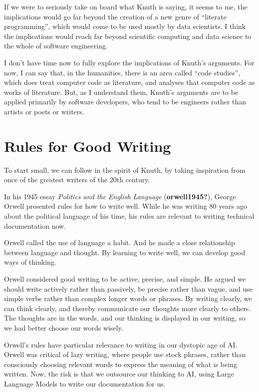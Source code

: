 \documentclass[
  letterpaper,
  DIV=11,
  numbers=noendperiod]{scrartcl}
\begin{document}
If we were to seriously take on board what Knuth is saying, it seems to
me, the implications would go far beyond the creation of a new genre of
``literate programming'', which would come to be used mostly by data
scientists. I think the implications would reach far beyond scientific
computing and data science to the whole of software engineering.

I don't have time now to fully explore the implications of Knuth's
arguments. For now, I can say that, in the humanities, there is an area
called ``code studies'', which does treat computer code as literature,
and analyses that computer code as works of literature. But, as I
understand them, Knuth's arguments are to be applied primarily by
software developers, who tend to be engineers rather than artists or
poets or writers.

\section{Rules for Good Writing}\label{rules-for-good-writing}

To start small, we can follow in the spirit of Knuth, by taking
inspiration from once of the greatest writers of the 20th century.

In his 1945 essay \emph{Politics and the English Language}
(\textbf{orwell1945?}), George Orwell presented rules for how to write
well. While he was writing 80 years ago about the political language of
his time, his rules are relevant to writing technical documentation now.

Orwell called the use of language a habit. And he made a close
relationship between language and thought. By learning to write well, we
can develop good ways of thinking.

Orwell considered good writing to be active, precise, and simple. He
argued we should write actively rather than passively, be precise rather
than vague, and use simple verbs rather than complex longer words or
phrases. By writing clearly, we can think clearly, and thereby
communicate our thoughts more clearly to others. The thoughts are in the
words, and our thinking is displayed in our writing, so we had better
choose our words wisely.

Orwell's rules have particular relevance to writing in our dystopic age
of AI. Orwell was critical of lazy writing, where people use stock
phrases, rather than consciously choosing relevant words to express the
meaning of what is being written. Now, the risk is that we outsource our
thinking to AI, using Large Language Models to write our documentation
for us.
\end{document}

